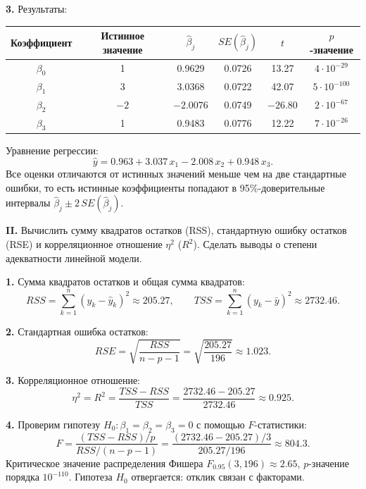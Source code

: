 \documentclass{article}
\begin{document}
    \textbf{3.} Результаты:
    \begin{center}
    \begin{tabular}{|c|c|c|c|c|c|}
        \hline
        Коэффициент & Истинное значение & $\hat\beta_j$ & $SE(\hat\beta_j)$ & $t$ & $p$-значение \\ \hline
        $\beta_0$ & 1 & 0.9629 & 0.0726 & 13.27 & $4\cdot10^{-29}$ \\
        $\beta_1$ & 3 & 3.0368 & 0.0722 & 42.07 & $5\cdot10^{-100}$ \\
        $\beta_2$ & $-2$ & $-2.0076$ & 0.0749 & $-26.80$ & $2\cdot10^{-67}$ \\
        $\beta_3$ & 1 & 0.9483 & 0.0776 & 12.22 & $7\cdot10^{-26}$ \\ \hline
    \end{tabular}
    \end{center}
    Уравнение регрессии:
    \[\hat y=0.963+3.037\,x_1-2.008\,x_2+0.948\,x_3.\]
    Все оценки отличаются от истинных значений меньше чем на две стандартные ошибки, то есть истинные коэффициенты попадают в 95\%-доверительные интервалы $\hat\beta_j\pm2\,SE(\hat\beta_j)$.

\begin{framed}
    \textbf{II.} Вычислить сумму квадратов остатков (RSS), стандартную ошибку остатков (RSE)
    и корреляционное отношение $\eta^2$ ($R^2$). Сделать выводы о степени адекватности линейной модели.
\end{framed}
    \textbf{1.} Сумма квадратов остатков и общая сумма квадратов:
    \[RSS=\sum_{k=1}^{n}(y_k-\hat y_k)^2\approx205.27,\qquad TSS=\sum_{k=1}^{n}(y_k-\bar y)^2\approx2732.46.\]

    \textbf{2.} Стандартная ошибка остатков:
    \[RSE=\sqrt{\frac{RSS}{n-p-1}}=\sqrt{\frac{205.27}{196}}\approx1.023.\]

    \textbf{3.} Корреляционное отношение:
    \[\eta^2=R^2=\frac{TSS-RSS}{TSS}=\frac{2732.46-205.27}{2732.46}\approx0.925.\]

    \textbf{4.} Проверим гипотезу $H_0:\beta_1=\beta_2=\beta_3=0$ с помощью $F$-статистики:
    \[F=\frac{(TSS-RSS)/p}{RSS/(n-p-1)}=\frac{(2732.46-205.27)/3}{205.27/196}\approx804.3.\]
    Критическое значение распределения Фишера $F_{0.95}(3,196)\approx2.65$, $p$-значение порядка $10^{-110}$. Гипотеза $H_0$ отвергается: отклик связан с факторами.
\end{document}
